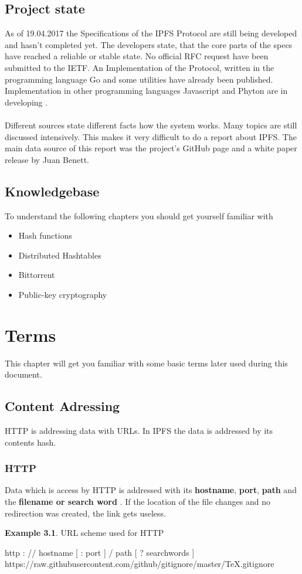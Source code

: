 \documentclass[a4paper,11pt, oneside]{report}
\theoremstyle{definition}
\newtheorem{exmp}{Example}[subsection]
\begin{document}
\section{Project state}
As of 19.04.2017 the Specifications of the IPFS Protocol are still being developed and hasn't completed yet. The developers state, that the core parts of the specs have reached a reliable or stable state. No official RFC request have been submitted to the IETF. An Implementation of the Protocol, written in the programming language Go and some utilities have already been published. Implementation in other programming languages Javascript and Phyton are in developing \cite{specs}.\\ \\
Different sources state different facts how the system works. Many topics are still discussed intensively. This makes it very difficult to do a report about IPFS. The main data source of this report was the project's GitHub page and a white paper release by Juan Benett.

\section{Knowledgebase}
To understand the following chapters you should get yourself familiar with
\begin{itemize}
\item Hash functions
\item Distributed Hashtables
\item Bittorrent
\item Public-key cryptography 
\end{itemize}

\newpage
 

\chapter{Terms}
This chapter will get you familiar with some basic terms later used during this document.
\section{Content Adressing}
HTTP is addressing data with URLs. In IPFS the data is addressed by its contents hash.
\subsection{HTTP}
Data which is access by HTTP is addressed with its \textbf{hostname}, \textbf{port}, \textbf{path} and the \textbf{filename or search word} \cite{HTTPAdressing}. If the location of the file changes and no redirection was created, the link gets useless.
\begin{exmp} URL scheme used for HTTP
\noindent
\begin{center}
http : // hostname [ : port ] / path [ ? searchwords ]\\
https://raw.githubusercontent.com/github/gitignore/master/TeX.gitignore
\end{center}
\end{exmp}
\end{document}
